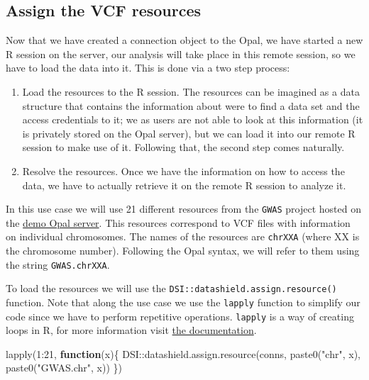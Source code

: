 \documentclass[
]{book}
\newenvironment{Shaded}{\begin{snugshade}}{\end{snugshade}}
\newcommand{\ControlFlowTok}[1]{\textcolor[rgb]{0.13,0.29,0.53}{\textbf{#1}}}
\newcommand{\DecValTok}[1]{\textcolor[rgb]{0.00,0.00,0.81}{#1}}
\newcommand{\FunctionTok}[1]{\textcolor[rgb]{0.00,0.00,0.00}{#1}}
\newcommand{\NormalTok}[1]{#1}
\newcommand{\SpecialCharTok}[1]{\textcolor[rgb]{0.00,0.00,0.00}{#1}}
\newcommand{\StringTok}[1]{\textcolor[rgb]{0.31,0.60,0.02}{#1}}
\providecommand{\tightlist}{%
  \setlength{\itemsep}{0pt}\setlength{\parskip}{0pt}}
\begin{document}
\hypertarget{assign-the-vcf-resources}{%
\subsection{Assign the VCF resources}\label{assign-the-vcf-resources}}

Now that we have created a connection object to the Opal, we have started a new R session on the server, our analysis will take place in this remote session, so we have to load the data into it. This is done via a two step process:

\begin{enumerate}
\def\labelenumi{\arabic{enumi}.}
\tightlist
\item
  Load the resources to the R session. The resources can be imagined as a data structure that contains the information about were to find a data set and the access credentials to it; we as users are not able to look at this information (it is privately stored on the Opal server), but we can load it into our remote R session to make use of it. Following that, the second step comes naturally.
\item
  Resolve the resources. Once we have the information on how to access the data, we have to actually retrieve it on the remote R session to analyze it.
\end{enumerate}

In this use case we will use 21 different resources from the \texttt{GWAS} project hosted on the \href{https://opal-demo.obiba.org/}{demo Opal server}. This resources correspond to VCF files with information on individual chromosomes. The names of the resources are \texttt{chrXXA} (where XX is the chromosome number). Following the Opal syntax, we will refer to them using the string \texttt{GWAS.chrXXA}.

To load the resources we will use the \texttt{DSI::datashield.assign.resource()} function. Note that along the use case we use the \texttt{lapply} function to simplify our code since we have to perform repetitive operations. \texttt{lapply} is a way of creating loops in R, for more information visit \href{https://www.rdocumentation.org/packages/base/versions/3.6.2/topics/lapply}{the documentation}.

\begin{Shaded}
\begin{Highlighting}[]
\FunctionTok{lapply}\NormalTok{(}\DecValTok{1}\SpecialCharTok{:}\DecValTok{21}\NormalTok{, }\ControlFlowTok{function}\NormalTok{(x)\{}
\NormalTok{  DSI}\SpecialCharTok{::}\FunctionTok{datashield.assign.resource}\NormalTok{(conns, }\FunctionTok{paste0}\NormalTok{(}\StringTok{"chr"}\NormalTok{, x), }\FunctionTok{paste0}\NormalTok{(}\StringTok{"GWAS.chr"}\NormalTok{, x))}
\NormalTok{  \})}
\end{Highlighting}
\end{Shaded}
\end{document}
